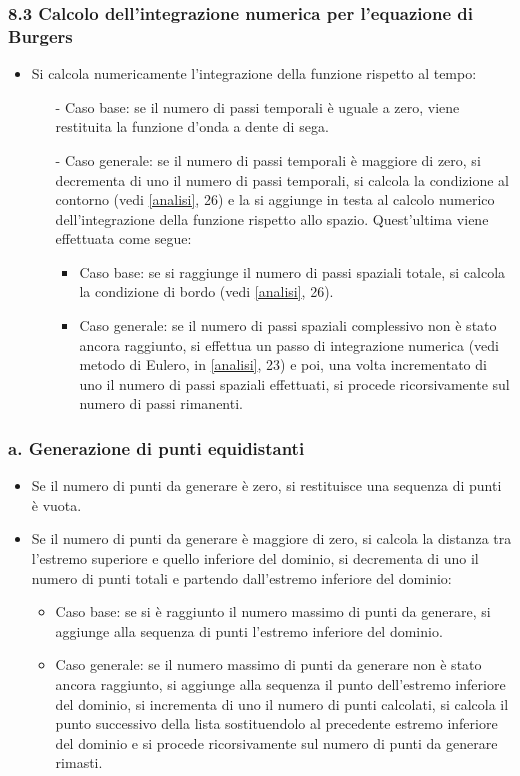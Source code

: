 \subsubsection*{8.3 Calcolo dell'integrazione numerica per l'equazione di Burgers}
\begin{itemize}
\item Si calcola numericamente l'integrazione della funzione rispetto al tempo:
\begin{itemize}
\item[-] Caso base: se il numero di passi temporali è uguale a zero, viene restituita la funzione d'onda a dente di sega.
\item[-] Caso generale: se il numero di passi temporali è maggiore di zero, si decrementa di uno il numero di passi temporali, si calcola la condizione al contorno (vedi \ref{analisi}, 26) e la si aggiunge in testa al calcolo numerico dell'integrazione della funzione rispetto allo spazio. Quest'ultima viene effettuata come segue:
\begin{itemize}
\item Caso base: se si raggiunge il numero di passi spaziali totale, si calcola la condizione di bordo (vedi \ref{analisi}, 26).
\item Caso generale: se il numero di passi spaziali complessivo non è stato ancora raggiunto, si effettua un passo di integrazione numerica (vedi metodo di Eulero, in \ref{analisi}, 23) e poi, una volta incrementato di uno il numero di passi spaziali effettuati, si procede ricorsivamente sul numero di passi rimanenti. 
\end{itemize}
\end{itemize}
\end{itemize}


\subsubsection*{a. Generazione di punti equidistanti}
\begin{itemize}
\item Se il numero di punti da generare è zero, si restituisce una sequenza di punti è vuota.
\item Se il numero di punti da generare è maggiore di zero, si calcola la distanza tra l'estremo superiore e quello inferiore del dominio, si decrementa di uno il numero di punti totali e partendo dall'estremo inferiore del dominio:
\begin{itemize}
\item Caso base: se si è raggiunto il numero massimo di punti da generare, si aggiunge alla sequenza di punti l'estremo inferiore del dominio.
\item Caso generale: se il numero massimo di punti da generare non è stato ancora raggiunto, si aggiunge alla sequenza il punto dell'estremo inferiore del dominio, si incrementa di uno il numero di punti calcolati, si calcola il punto successivo della lista sostituendolo al precedente estremo inferiore del dominio e si procede ricorsivamente sul numero di punti da generare rimasti.
\end{itemize}
\end{itemize}

